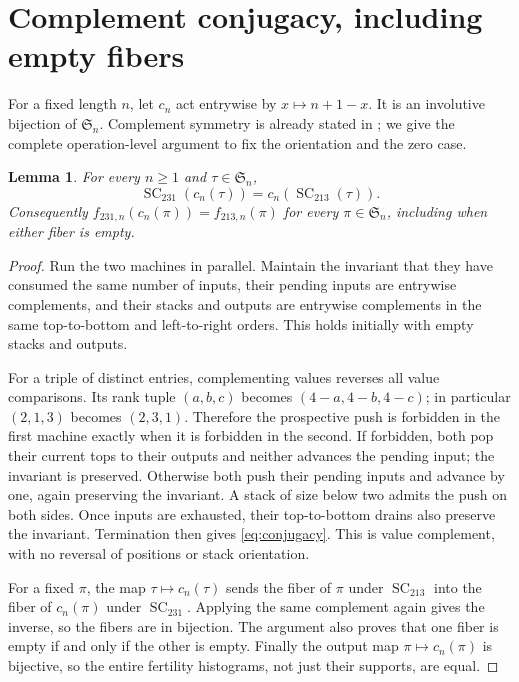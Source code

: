 \documentclass[11pt,a4paper]{article}
\newtheorem{lemma}{Lemma}
\newcommand{\SC}{\operatorname{SC}}
\newcommand{\Sn}{\mathfrak S_n}
\begin{document}
\section{Complement conjugacy, including empty fibers}
For a fixed length $n$, let $c_n$ act entrywise by $x\mapsto n+1-x$.
It is an involutive bijection of $\Sn$. Complement symmetry is already
stated in \cite[Theorem 3.5 and Corollary 3.6]{K}; we give the complete
operation-level argument to fix the orientation and the zero case.

\begin{lemma}\label{lem:complement}
For every $n\ge1$ and $\tau\in\Sn$,
\begin{equation}\label{eq:conjugacy}
 \SC_{231}(c_n(\tau))=c_n(\SC_{213}(\tau)).
\end{equation}
Consequently $f_{231,n}(c_n(\pi))=f_{213,n}(\pi)$ for every
$\pi\in\Sn$, including when either fiber is empty.
\end{lemma}
\begin{proof}
Run the two machines in parallel. Maintain the invariant that they
have consumed the same number of inputs, their pending inputs are
entrywise complements, and their stacks and outputs are entrywise
complements in the same top-to-bottom and left-to-right orders.
This holds initially with empty stacks and outputs.

For a triple of distinct entries, complementing values reverses all
value comparisons. Its rank tuple $(a,b,c)$ becomes $(4-a,4-b,4-c)$;
in particular $(2,1,3)$ becomes $(2,3,1)$. Therefore the prospective
push is forbidden in the first machine exactly when it is forbidden
in the second. If forbidden, both pop their current tops to their
outputs and neither advances the pending input; the invariant is
preserved. Otherwise both push their pending inputs and advance by
one, again preserving the invariant. A stack of size below two
admits the push on both sides. Once inputs are exhausted, their
top-to-bottom drains also preserve the invariant. Termination then
gives \eqref{eq:conjugacy}. This is value complement, with no reversal
of positions or stack orientation.

For a fixed $\pi$, the map $\tau\mapsto c_n(\tau)$ sends the fiber
of $\pi$ under $\SC_{213}$ into the fiber of $c_n(\pi)$ under
$\SC_{231}$. Applying the same complement again gives the inverse,
so the fibers are in bijection. The argument also proves that one
fiber is empty if and only if the other is empty. Finally the
output map $\pi\mapsto c_n(\pi)$ is bijective, so the entire fertility
histograms, not just their supports, are equal.
\end{proof}
\end{document}

